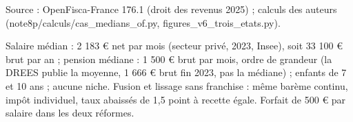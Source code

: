 Source : OpenFisca-France 176.1 (droit des revenus 2025) ; calculs des auteurs (note8p/calculs/cas\_medians\_of.py, figures\_v6\_trois\_etats.py).\par Salaire médian : 2 183 € net par mois (secteur privé, 2023, Insee), soit 33 100 € brut par an ; pension médiane : 1 500 € brut par mois, ordre de grandeur (la DREES publie la moyenne, 1 666 € brut fin 2023, pas la médiane) ; enfants de 7 et 10 ans ; aucune niche. Fusion et lissage sans franchise : même barème continu, impôt individuel, taux abaissés de 1,5 point à recette égale. Forfait de 500 € par salaire dans les deux réformes.

